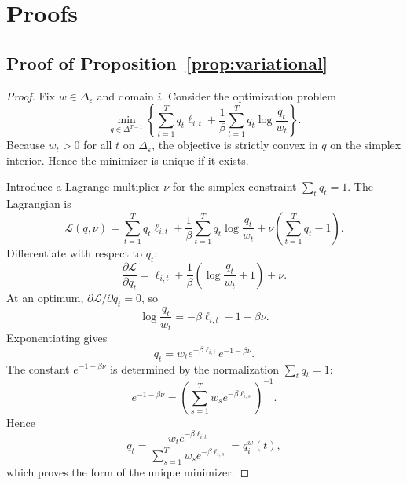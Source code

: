 \documentclass{article}
\newcommand{\simplex}{\Delta}
\newcommand{\epssimplex}{\simplex_{\varepsilon}}
\begin{document}
\section{Proofs}

\subsection{Proof of Proposition~\ref{prop:variational}}

\begin{proof}
Fix \(w \in \epssimplex\) and domain \(i\). Consider the optimization problem
\begin{equation}
    \min_{q \in \simplex^{T-1}}
    \left\{
        \sum_{t=1}^{T} q_t \ell_{i,t}
        +
        \frac{1}{\beta}\sum_{t=1}^{T} q_t \log \frac{q_t}{w_t}
    \right\}.
    \label{eq:var_problem_appendix}
\end{equation}
Because \(w_t > 0\) for all \(t\) on \(\epssimplex\), the objective is strictly convex in \(q\) on the simplex interior. Hence the minimizer is unique if it exists.

Introduce a Lagrange multiplier \(\nu\) for the simplex constraint \(\sum_t q_t = 1\). The Lagrangian is
\begin{equation}
    \mathcal{L}(q,\nu)
    =
    \sum_{t=1}^{T} q_t \ell_{i,t}
    +
    \frac{1}{\beta}\sum_{t=1}^{T} q_t \log \frac{q_t}{w_t}
    +
    \nu \left(\sum_{t=1}^{T} q_t - 1\right).
\end{equation}
Differentiate with respect to \(q_t\):
\begin{equation}
    \frac{\partial \mathcal{L}}{\partial q_t}
    =
    \ell_{i,t}
    +
    \frac{1}{\beta}\left(\log \frac{q_t}{w_t} + 1\right)
    +
    \nu.
\end{equation}
At an optimum, \(\partial \mathcal{L}/\partial q_t = 0\), so
\begin{equation}
    \log \frac{q_t}{w_t}
    =
    -\beta \ell_{i,t} - 1 - \beta \nu.
\end{equation}
Exponentiating gives
\begin{equation}
    q_t
    =
    w_t e^{-\beta \ell_{i,t}} e^{-1-\beta \nu}.
\end{equation}
The constant \(e^{-1-\beta \nu}\) is determined by the normalization \(\sum_t q_t = 1\):
\begin{equation}
    e^{-1-\beta \nu}
    =
    \left(\sum_{s=1}^{T} w_s e^{-\beta \ell_{i,s}}\right)^{-1}.
\end{equation}
Hence
\begin{equation}
    q_t
    =
    \frac{w_t e^{-\beta \ell_{i,t}}}{\sum_{s=1}^{T} w_s e^{-\beta \ell_{i,s}}}
    =
    q_i^w(t),
\end{equation}
which proves the form of the unique minimizer.


\end{proof}
\end{document}
